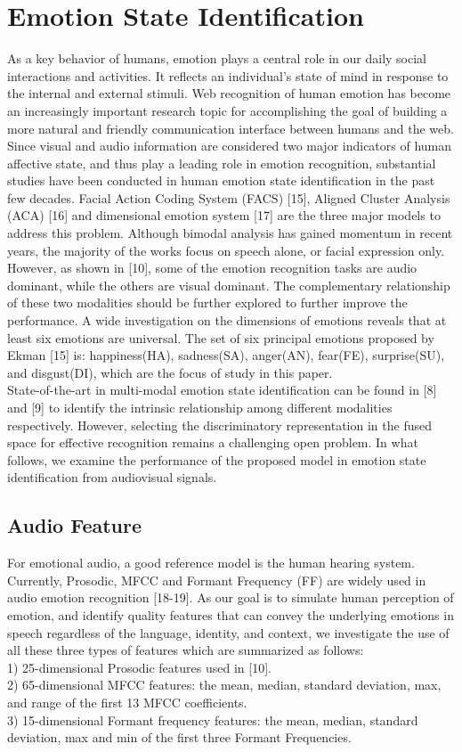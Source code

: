 \documentclass[10pt,journal,compsoc]{IEEEtran}
\begin{document}
\section{Emotion State Identification}
As a key behavior of humans, emotion plays a central role in our daily social interactions and activities. It reflects an individual's state of mind in response to the internal and external stimuli. Web recognition of human emotion has become an increasingly important research topic for accomplishing the goal of building a more natural and friendly communication interface between humans and the web. \\\indent Since visual and audio information are considered two major indicators of human affective state, and thus play a leading role in emotion recognition, substantial studies have been conducted in human emotion state identification in the past few decades. Facial Action Coding System (FACS) [15], Aligned Cluster Analysis (ACA) [16] and dimensional emotion system [17] are the three major models to address this problem. Although bimodal analysis has gained momentum in recent years, the majority of the works focus on speech alone, or facial expression only. However, as shown in [10], some of the emotion recognition tasks are audio dominant, while the others are visual dominant. The complementary relationship of these two modalities should be further explored to further improve the performance. A wide investigation on the dimensions of emotions reveals that at least six emotions are universal. The set of six principal emotions proposed by Ekman [15] is: happiness(HA), sadness(SA), anger(AN), fear(FE), surprise(SU), and disgust(DI), which are the focus of study in this paper. \\\indent State-of-the-art in multi-modal emotion state identification can be found in [8] and [9] to identify the intrinsic relationship among different modalities respectively. However, selecting the discriminatory representation in the fused space for effective recognition remains a challenging open problem. In what follows, we examine the performance of the proposed model in emotion state identification from audiovisual signals.
\subsection{Audio Feature}
For emotional audio, a good reference model is the human hearing system. Currently, Prosodic, MFCC and Formant Frequency (FF) are widely used in audio emotion recognition [18-19]. As our goal is to simulate human perception of emotion, and identify quality features that can convey the underlying emotions in speech regardless of the language, identity, and context, we investigate the use of all these three types of features which are summarized as follows:\\
1)  25-dimensional Prosodic features used in [10].\\
2)  65-dimensional MFCC features: the mean, median, standard deviation, max, and range of the first 13 MFCC coefficients.\\
3)  15-dimensional Formant frequency features: the mean, median, standard deviation, max and min of the first three Formant Frequencies.\\
\end{document}
